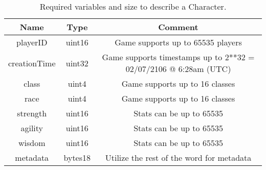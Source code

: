 \begin{table}[H]
	\centering
	\vspace*{-1ex}
	\scriptsize
	\vspace{-1ex}
	\caption{Required variables and size to describe a Character.}
	\begin{tabular}{|c|c|c|}
        \hline
        \textbf{Name} & \textbf{Type}  & \textbf{Comment}\\ \hline 
        playerID      & uint16         & Game supports up to 65535 players\\
        creationTime  & uint32         & Game supports timestamps up to 2**32 = 02/07/2106 @ 6:28am (UTC) \\
        class         & uint4          & Game supports up to 16 classes \\
        race          & uint4          & Game supports up to 16 classes \\
        strength      & uint16         & Stats can be up to 65535\\
        agility       & uint16         & Stats can be up to 65535 \\
        wisdom        & uint16         & Stats can be up to 65535 \\
        metadata      & bytes18        & Utilize the rest of the word for metadata \\
        \hline
    \end{tabular}
    \label{table:characteristics}
\end{table}